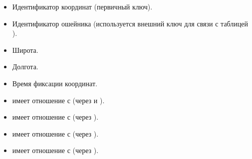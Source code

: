 \documentclass[letterpaper,10pt,russian]{sphinxmanual}
\begin{document}
\sphinxAtStartPar
{}
\begin{itemize}
\item {} 
\sphinxAtStartPar
{}  Идентификатор координат (первичный ключ).

\item {} 
\sphinxAtStartPar
{}  Идентификатор ошейника (используется внешний ключ для связи с таблицей ).

\item {} 
\sphinxAtStartPar
{}  Широта.

\item {} 
\sphinxAtStartPar
{}  Долгота.

\item {} 
\sphinxAtStartPar
{}  Время фиксации координат.

\end{itemize}

\sphinxAtStartPar
{}
\begin{itemize}
\item {} 
\sphinxAtStartPar
{} имеет отношение   с  (через  и ).

\item {} 
\sphinxAtStartPar
{} имеет отношение   с  (через ).

\item {} 
\sphinxAtStartPar
{} имеет отношение   с  (через ).

\item {} 
\sphinxAtStartPar
{} имеет отношение   с  (через ).

\end{itemize}
\end{document}
